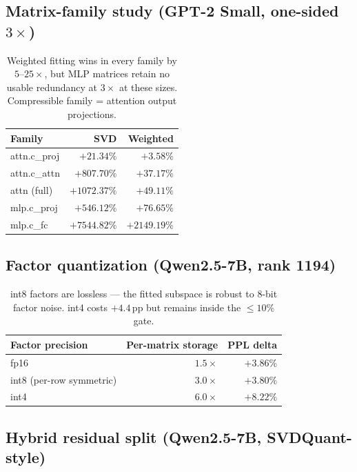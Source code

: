 \documentclass[11pt]{article}
\begin{document}
\subsection{Matrix-family study (GPT-2 Small, one-sided $3\times$)}\label{sec:families}

\begin{table}[h]
\centering
\begin{tabular}{lrr}
\toprule
Family & SVD & Weighted \\
\midrule
attn.c\_proj & $+21.34\%$  & $\mathbf{+3.58\%}$ \\
attn.c\_attn & $+807.70\%$ & $+37.17\%$ \\
attn (full)  & $+1072.37\%$& $+49.11\%$ \\
mlp.c\_proj  & $+546.12\%$ & $+76.65\%$ \\
mlp.c\_fc    & $+7544.82\%$& $+2149.19\%$ \\
\bottomrule
\end{tabular}
\caption{Weighted fitting wins in every family by $5$--$25\times$, but MLP
matrices retain no usable redundancy at $3\times$ at these sizes.
Compressible family = attention output projections.}
\label{tab:families}
\end{table}

\subsection{Factor quantization (Qwen2.5-7B, rank 1194)}

\begin{table}[h]
\centering
\begin{tabular}{lrr}
\toprule
Factor precision & Per-matrix storage & PPL delta \\
\midrule
fp16                    & $1.5\times$ & $+3.86\%$ \\
int8 (per-row symmetric)& $3.0\times$ & $\mathbf{+3.80\%}$ \\
int4                    & $6.0\times$ & $+8.22\%$ \\
\bottomrule
\end{tabular}
\caption{int8 factors are lossless --- the fitted subspace is robust to
8-bit factor noise. int4 costs $+4.4$\,pp but remains inside the
$\le 10\%$ gate.}
\label{tab:factorquant}
\end{table}

\subsection{Hybrid residual split (Qwen2.5-7B, SVDQuant-style)}
\end{document}
